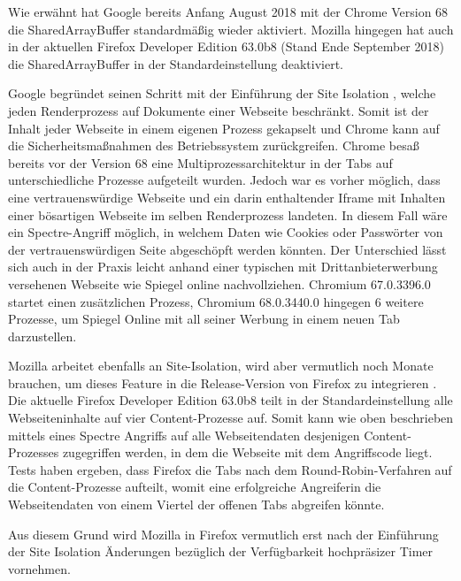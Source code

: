 Wie erwähnt hat Google bereits Anfang August 2018 mit der Chrome Version 68 \cite{ChromeSharedArrayBufferAgain} die SharedArrayBuffer standardmäßig wieder aktiviert.
Mozilla hingegen hat auch in der aktuellen Firefox Developer Edition 63.0b8 (Stand Ende September 2018) die SharedArrayBuffer in der Standardeinstellung deaktiviert.

Google begründet seinen Schritt mit der Einführung der Site Isolation \cite{ChromeSiteIsolation}, welche jeden Renderprozess auf Dokumente einer Webseite beschränkt. Somit ist der Inhalt jeder Webseite in einem eigenen Prozess gekapselt und Chrome kann auf die Sicherheitsmaßnahmen des Betriebssystem zurückgreifen.
Chrome besaß bereits vor der Version 68 eine Multiprozessarchitektur in der Tabs auf unterschiedliche Prozesse aufgeteilt wurden.
Jedoch war es vorher möglich, dass eine vertrauenswürdige Webseite und ein darin enthaltender Iframe mit Inhalten einer bösartigen Webseite im selben Renderprozess landeten.
In diesem Fall wäre ein Spectre-Angriff möglich, in welchem Daten wie Cookies oder Passwörter von der vertrauenswürdigen Seite abgeschöpft werden könnten.
Der Unterschied lässt sich auch in der Praxis leicht anhand einer typischen mit Drittanbieterwerbung versehenen Webseite wie Spiegel online nachvollziehen.
Chromium 67.0.3396.0 startet einen zusätzlichen Prozess, Chromium 68.0.3440.0 hingegen 6 weitere Prozesse, um Spiegel Online mit all seiner Werbung in einem neuen Tab darzustellen.


Mozilla arbeitet ebenfalls an Site-Isolation, wird aber vermutlich noch Monate brauchen, um dieses Feature in die Release-Version von Firefox zu integrieren \cite{FirefoxSiteIsolation}.
Die aktuelle Firefox Developer Edition 63.0b8 teilt in der Standardeinstellung alle Webseiteninhalte auf vier Content-Prozesse auf. 
Somit kann wie oben beschrieben mittels eines Spectre Angriffs auf alle Webseitendaten desjenigen Content-Prozesses zugegriffen werden, in dem die Webseite mit dem Angriffscode liegt.
Tests haben ergeben, dass Firefox die Tabs nach dem Round-Robin-Verfahren auf die Content-Prozesse aufteilt, womit eine erfolgreiche Angreiferin die Webseitendaten von einem Viertel der offenen Tabs abgreifen könnte.

Aus diesem Grund wird Mozilla in Firefox vermutlich erst nach der Einführung der Site Isolation Änderungen bezüglich der Verfügbarkeit hochpräsizer Timer vornehmen.

